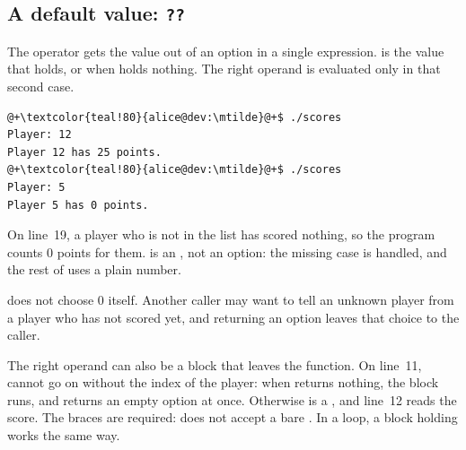 
\subsection{A default value: \texttt{??}}

The operator  gets the value out of an option in a single expression.
 is the value that  holds, or  when 
holds nothing. The right operand is evaluated only in that second case.


\vspace{-10pt}%
\begin{lstlisting}[style=bashVerb, escapechar=@+]
@+\textcolor{teal!80}{alice@dev:\mtilde}@+$ ./scores
Player: 12
Player 12 has 25 points.
@+\textcolor{teal!80}{alice@dev:\mtilde}@+$ ./scores
Player: 5
Player 5 has 0 points.
\end{lstlisting}

On line~19, a player who is not in the list has scored nothing, so the program
counts 0 points for them.  is an , not an option: the
missing case is handled, and the rest of  uses a plain number.

 does not choose 0 itself. Another caller may want to tell an
unknown player from a player who has not scored yet, and returning an option
leaves that choice to the caller.

The right operand can also be a block that leaves the function. On line~11,
 cannot go on without the index of the player: when 
returns nothing, the block  runs, and 
returns an empty option at once. Otherwise  is a , and
line~12 reads the score. The braces are required:  does not accept a
bare . In a loop, a block holding  works the same
way.
